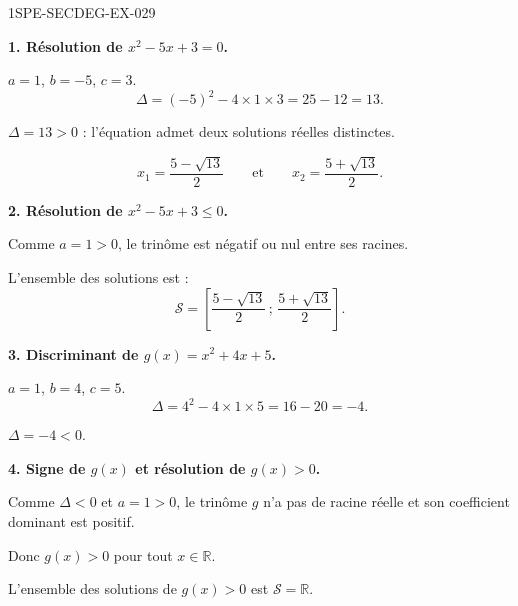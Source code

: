 \begin{corrige}{1SPE-SECDEG-EX-029}

\textbf{1. Résolution de $x^2 - 5x + 3 = 0$.}


$a = 1$, $b = -5$, $c = 3$.
\[\Delta = (-5)^2 - 4 \times 1 \times 3 = 25 - 12 = 13.\]

$\Delta = 13 > 0$ : l'équation admet deux solutions réelles distinctes.

\[x_1 = \frac{5 - \sqrt{13}}{2} \qquad \text{et} \qquad x_2 = \frac{5 + \sqrt{13}}{2}.\]

\medskip
\textbf{2. Résolution de $x^2 - 5x + 3 \leqslant 0$.}


Comme $a = 1 > 0$, le trinôme est négatif ou nul entre ses racines.

L'ensemble des solutions est :
\[\mathcal{S} = \left[\frac{5 - \sqrt{13}}{2}\,;\,\frac{5 + \sqrt{13}}{2}\right].\]

\medskip
\textbf{3. Discriminant de $g(x) = x^2 + 4x + 5$.}


$a = 1$, $b = 4$, $c = 5$.
\[\Delta = 4^2 - 4 \times 1 \times 5 = 16 - 20 = -4.\]

$\Delta = -4 < 0$.

\medskip
\textbf{4. Signe de $g(x)$ et résolution de $g(x) > 0$.}


Comme $\Delta < 0$ et $a = 1 > 0$, le trinôme $g$ n'a pas de racine réelle et son coefficient dominant est positif.

Donc $g(x) > 0$ pour tout $x \in \mathbb{R}$.

L'ensemble des solutions de $g(x) > 0$ est $\mathcal{S} = \mathbb{R}$.

\end{corrige}
